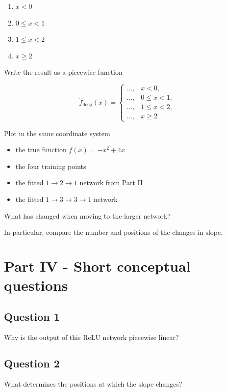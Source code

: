 \documentclass{course_sheet}
\begin{document}
\begin{enumerate}
\item
$x<0$

\item
$0\leq x<1$

\item
$1\leq x<2$

\item
$x\geq2$

\end{enumerate}
Write the result as a piecewise function

\[
\hat f_{\mathrm{deep}}(x)=
\begin{cases}
\ldots, & x<0,\\
\ldots, & 0\leq x<1,\\
\ldots, & 1\leq x<2,\\
\ldots, & x\geq2
\end{cases}
\]

Plot in the same coordinate system

\begin{itemize}
\item
the true function $f(x)=-x^2+4x$

\item
the four training points

\item
the fitted $1\rightarrow2\rightarrow1$ network from Part II

\item
the fitted $1\rightarrow3\rightarrow3\rightarrow1$ network

\end{itemize}
What has changed when moving to the larger network?

In particular, compare the number and positions of the changes in slope.

\clearpage
\section*{Part IV - Short conceptual questions}
\subsection*{Question 1}
Why is the output of this ReLU network piecewise linear?

\subsection*{Question 2}
What determines the positions at which the slope changes?
\end{document}
